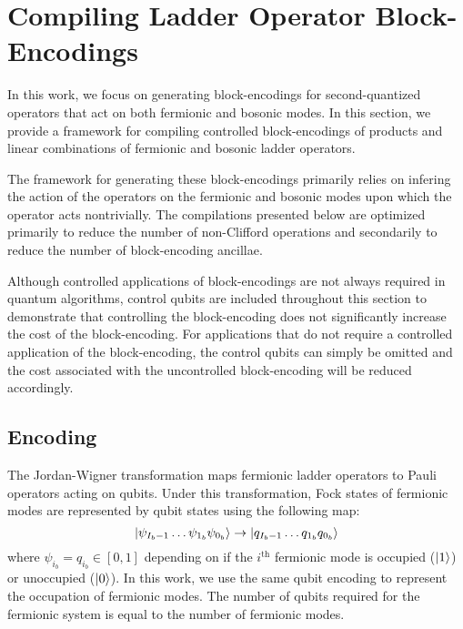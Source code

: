 \section{Compiling Ladder Operator Block-Encodings}
\label{sec:ladder-op-oracles}

In this work, we focus on generating block-encodings for second-quantized operators that act on both fermionic and bosonic modes.
In this section, we provide a framework for compiling controlled block-encodings of products and linear combinations of fermionic and bosonic ladder operators.

The framework for generating these block-encodings primarily relies on infering the action of the operators on the fermionic and bosonic modes upon which the operator acts nontrivially. 
The compilations presented below are optimized primarily to reduce the number of non-Clifford operations and secondarily to reduce the number of block-encoding ancillae.

Although controlled applications of block-encodings are not always required in quantum algorithms, control qubits are included throughout this section to demonstrate that controlling the block-encoding does not significantly increase the cost of the block-encoding.
For applications that do not require a controlled application of the block-encoding, the control qubits can simply be omitted and the cost associated with the uncontrolled block-encoding will be reduced accordingly.

\subsection{Encoding}
\label{subsec:encoding}

The Jordan-Wigner transformation \cite{jordan-wigner} maps fermionic ladder operators to Pauli operators acting on qubits.
Under this transformation, Fock states of fermionic modes are represented by qubit states using the following map:
\begin{equation}
    \ket{\psi_{{I_b - 1}} \dots \psi_{1_b} \psi_{0_b}} \rightarrow \ket{q_{{I_b - 1}} \dots q_{1_b} q_{0_b}}
\end{equation}
where $\psi_{i_b} = q_{i_b} \in [0, 1]$ depending on if the $i^\text{th}$ fermionic mode is occupied ($\ket{1}$) or unoccupied ($\ket{0}$).
In this work, we use the same qubit encoding to represent the occupation of fermionic modes.
The number of qubits required for the fermionic system is equal to the number of fermionic modes.

